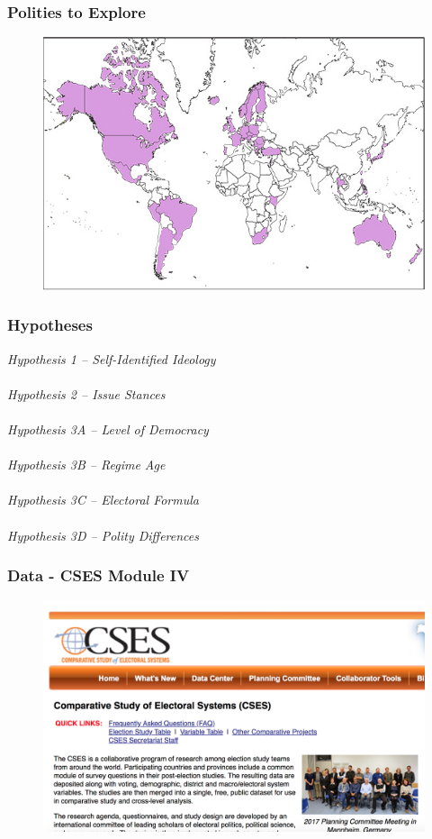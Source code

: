 \documentclass[20pt]{beamer}
\newcommand\e{\emph}
\begin{document}
\begin{frame}
\frametitle{Polities to Explore}
\begin{figure}[H]    \centering
	{	 \includegraphics[width=.9\textwidth]{Mod4}}
\end{figure}
\end{frame}

\begingroup
\begin{frame}
\footnotesize
\frametitle{Hypotheses}
\e {Hypothesis 1 -- Self-Identified Ideology} \\
~~\\
\e{Hypothesis 2 -- Issue Stances} \\
~~\\
\e{Hypothesis 3A -- Level of Democracy} \\
~~\\
\e{Hypothesis 3B -- Regime Age} \\
~~\\
\e{Hypothesis 3C -- Electoral Formula}\\
~~\\
\e{Hypothesis 3D -- Polity Differences} 

\end{frame}

\begin{frame}
\frametitle{Data - CSES Module IV}
\begin{figure}[H]    \centering
	{	 \includegraphics[width=.9\textwidth]{CSES}}
\end{figure}
\end{frame}
\end{document}
